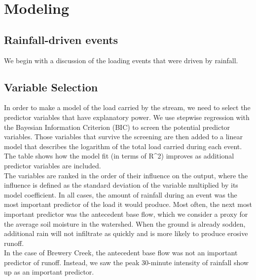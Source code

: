 \section{Modeling}

\subsection{Rainfall-driven events}
We begin with a discussion of the loading events that were driven by rainfall.

\subsection{Variable Selection}
In order to make a model of the load carried by the stream, we need to select the predictor variables that have explanatory power. We use stepwise regression with the Bayesian Information Criterion (BIC) to screen the potential predictor variables. Those variables that survive the screening are then added to a linear model that describes the logarithm of the total load carried during each event. The table shows how the model fit (in terms of R^2) improves as additional predictor variables are included.\\

The variables are ranked in the order of their influence on the output, where the influence is defined as the standard deviation of the variable multiplied by its model coefficient. In all cases, the amount of rainfall during an event was the most important predictor of the load it would produce. Most often, the next most important predictor was the antecedent base flow, which we consider a proxy for the average soil moisture in the watershed. When the ground is already sodden, additional rain will not infiltrate as quickly and is more likely to produce erosive runoff.\\

In the case of Brewery Creek, the antecedent base flow was not an important predictor of runoff. Instead, we saw the peak 30-minute intensity of rainfall show up as an important predictor.\\